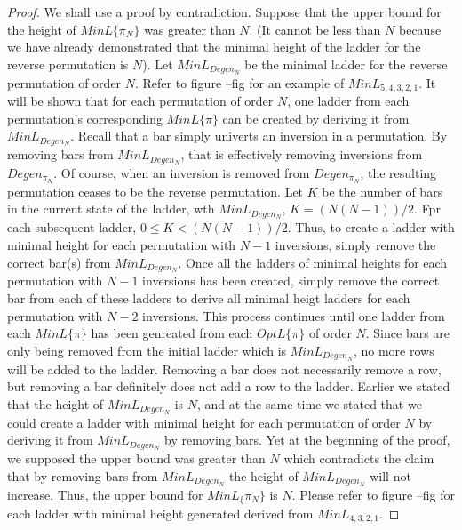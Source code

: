    \begin{proof}
       We shall use a proof by contradiction. Suppose that the upper bound for the height of $MinL\{\pi_{N}\}$ was greater than $N$. (It cannot be less than $N$ because 
       we have already demonstrated that the minimal height of the ladder for the reverse permutation is $N$). Let $MinL_{Degen_{N}}$ be the 
       minimal ladder for the reverse permutation of order $N$. Refer to figure --fig for an example of $MinL_{5,4,3,2,1}$. It will be shown that for each 
       permutation of order $N$, one ladder from each permutation's corresponding $MinL\{\pi\}$ can be created by deriving it from $MinL_{Degen_{N}}$.
       Recall that a bar simply univerts an inversion in a permutation. By removing bars from $MinL_{Degen_{N}}$, that is effectively removing 
       inversions from $Degen_{\pi_{N}}$. Of course, when an inversion is removed from $Degen_{\pi_{N}}$, the resulting permutation 
       ceases to be the reverse permutation. Let $K$ be the number of bars in the current state of the ladder, wth $MinL_{Degen_{N}}$, $K=(N(N-1))/2$. Fpr each subsequent 
       ladder, $0 \leq K < (N(N-1))/2$. Thus, to create a ladder with minimal height for each permutation with $N-1$ inversions, simply remove the correct bar(s) from $MinL_{Degen_{N}}$. 
       Once all the ladders of minimal heights for each permutation with $N-1$ inversions has been created, simply remove the correct bar from each of these ladders 
       to derive all minimal heigt ladders for each permutation with $N-2$ inversions. This process continues until one ladder from each $MinL\{\pi\}$ has 
       been genreated from each $OptL\{\pi\}$ of order $N$. Since bars are only being removed from the initial ladder which is $MinL_{Degen_{N}}$, no more rows 
       will be added to the ladder. Removing a bar does not necessarily remove a row, but removing a bar definitely does not add a row to the ladder. Earlier we stated that 
       the height of $MinL_{Degen_{N}}$ is $N$, and at the same time we stated that we could create a ladder with minimal height 
       for each permutation of order $N$ by deriving it from $MinL_{Degen_{N}}$ by removing bars. Yet at the beginning of the proof, 
       we supposed the upper bound was greater than $N$ which contradicts the claim that by removing bars from  
       $MinL_{Degen_{N}}$ the height of  $MinL_{Degen_{N}}$ will not increase. Thus, the upper bound for $MinL_\{\pi_{N}\}$ is $N$. 
       Please refer to figure --fig for each ladder with minimal height generated derived from $MinL_{4,3,2,1}$. 

   \end{proof}\pagebreak

